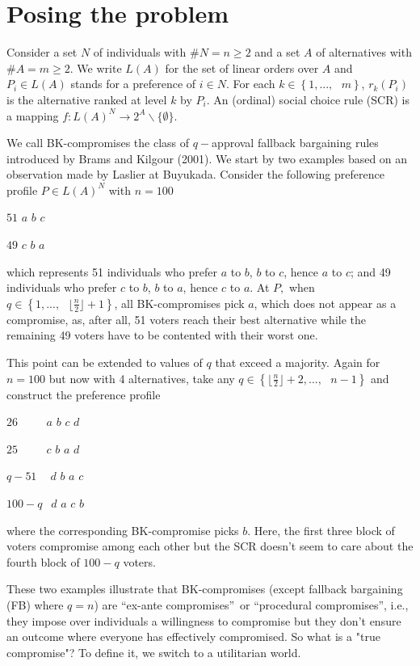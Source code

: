 \documentclass[12pt,notitlepage,a4paper]{article}
\begin{document}
\section{\protect\bigskip Posing the problem}

Consider a set $N$ of individuals with $\#N=n\geq 2$ and a set $A$ of
alternatives with $\#A=m\geq 2$. We write $L(A)$ for the set of linear
orders over $A$ and $P_{i}\in L(A)$ stands for a preference of $i\in N$. For
each $k\in \left\{ 1,...,\text{ }m\right\} $, $r_{k}(P_{i})$ is the
alternative ranked at level $k$ by $P_{i}$. An (ordinal) social choice rule
(SCR) is a mapping $f:L(A)^{N}\rightarrow 2^{A}\backslash \{\emptyset \}$.

We call BK-compromises the class of $q-$approval fallback bargaining rules
introduced by Brams and Kilgour (2001). We start by two examples based on an
observation made by Laslier at Buyukada. Consider the following preference
profile $P\in L(A)^{N}$ with $n=100$

$51$ $a$ $b$ $c$

$49$ $c$ $b$ $a$

which represents 51 individuals who prefer $a$ to $b$, $b$ to $c$, hence $a$
to $c$; and 49 individuals who prefer $c$ to $b$, $b$ to $a$, hence $c$ to $a
$. At $P,$ when $q\in \left\{ 1,...,\text{ }\lfloor \frac{n}{2}\rfloor
+1\right\} $, all BK-compromises pick $a$, which does not appear as a
compromise, as, after all, 51 voters reach their best alternative while the
remaining 49 voters have to be contented with their worst one.

This point can be extended to values of $q$ that exceed a majority. Again
for $n=100$ but now with 4 alternatives, take any $q\in \left\{ \lfloor 
\frac{n}{2}\rfloor +2,...,\text{ }n-1\right\} $ and construct the preference
profile

$26$ $\ \ \ \ \ \ \ \ \ \ a$ $b$ $c$ $d$

$25$ $\ \ \ \ \ \ \ \ \ \ c$ $b$ $a$ $d$

$q-51$ $\ \ \ \ d$ $b$ $a$ $c$

$100-q$ $\ \ d$ $a$ $c$ $b$

\bigskip where the corresponding BK-compromise picks $b$. Here, the first
three block of voters compromise among each other but the SCR doesn't seem
to care about the fourth block of $100-q$ voters.

These two examples illustrate that BK-compromises (except fallback
bargaining (FB) where $q=n$) are \textquotedblleft ex-ante
compromises\textquotedblright\ or \textquotedblleft procedural
compromises\textquotedblright , i.e., they impose over individuals a
willingness to compromise but they don't ensure an outcome where everyone
has effectively compromised. So what is a "true compromise"? To define it,
we switch to a utilitarian world.
\end{document}
